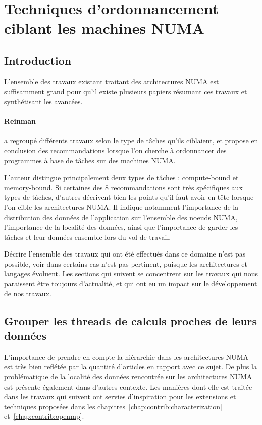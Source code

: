 \section{Techniques d'ordonnancement ciblant les machines NUMA}\label{sec:rw:numa}

\subsection{Introduction}

L'ensemble des travaux existant traitant des architectures NUMA est suffisamment grand pour qu'il existe plusieurs papiers résumant ces travaux et synthétisant les avancées.

\paragraph{Reinman~\cite{Reinman2015}} a regroupé différents travaux selon le type de tâches qu'ils ciblaient, et propose en conclusion des recommandations lorsque l'on cherche à ordonnancer des programmes à base de tâches sur des machines NUMA.

L'auteur distingue principalement deux types de tâches : compute-bound et memory-bound.
Si certaines des 8 recommandations sont très spécifiques aux types de tâches, d'autres décrivent bien les points qu'il faut avoir en tête lorsque l'on cible les architectures NUMA.
Il indique notamment l'importance de la distribution des données de l'application sur l'ensemble des noeuds NUMA, l'importance de la localité des données, ainsi que l'importance de garder les tâches et leur données ensemble lors du vol de travail.



Décrire l'ensemble des travaux qui ont été effectués dans ce domaine n'est pas possible, voir dans certains cas n'est pas pertinent, puisque les architectures et langages évoluent.
Les sections qui suivent se concentrent sur les travaux qui nous paraissent être toujours d'actualité, et qui ont eu un impact sur le développement de nos travaux.



\subsection{Grouper les threads de calculs proches de leurs données}

L'importance de prendre en compte la hiérarchie dans les architectures NUMA est très bien reflétée par la quantité d'articles en rapport avec ce sujet.
De plus la problématique de la localité des données rencontrée sur les architectures NUMA est présente également dans d'autres contexte.
Les manières dont elle est traitée dans les travaux qui suivent ont servies d'inspiration pour les extensions et techniques proposées dans les chapitres~\ref{chap:contrib:characterization} et~\ref{chap:contrib:openmp}.

